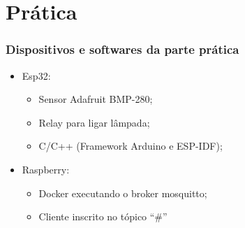 \documentclass[12pt]{beamer}
\begin{document}
\section{Prática}\label{Prática}
\begin{frame}
    \frametitle{Dispositivos e softwares da parte prática}
    \begin{itemize}
        \item Esp32:
            \begin{itemize}
                \item Sensor Adafruit BMP-280;
                \item Relay para ligar lâmpada;
                \item C/C++ (Framework Arduino e ESP-IDF);
            \end{itemize}
        \item Raspberry:
            \begin{itemize}
                \item Docker executando o broker mosquitto;
                \item Cliente inscrito no tópico ``\#''
            \end{itemize}
    \end{itemize}
\end{frame}
\end{document}
